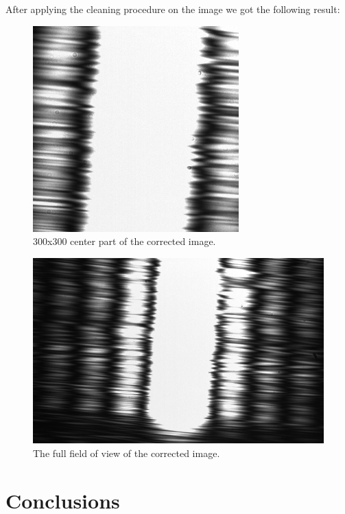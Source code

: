 \documentclass{emulateapj}
\begin{document}
After applying the cleaning procedure on the image we got the following result:

\begin{figure}[H]
\centering
\includegraphics[scale=0.3]{corrected_image.png}
\caption{300x300 center part of the corrected image.}
\label{img:corr}
\end{figure}

\begin{figure}[H]
\centering
\includegraphics[scale=0.2]{corrected_image_fov.png}
\caption{The full field of view of the corrected image.}
\label{img:corrFOV}
\end{figure}






\section{Conclusions}
\label{sec:conclusions}
\end{document}
